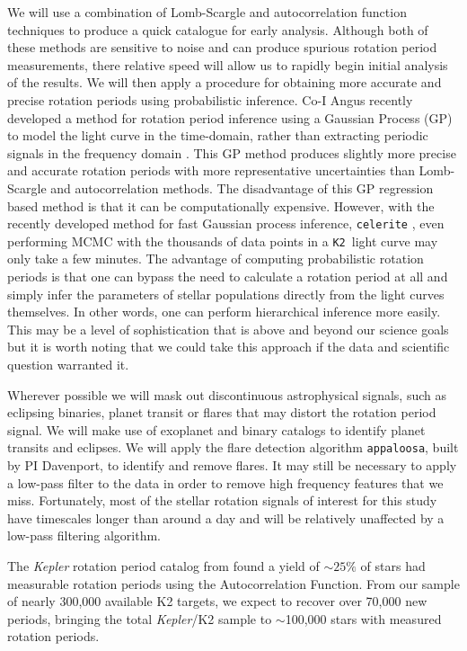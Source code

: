 \documentclass[12pt]{article}
\newcommand{\Kepler}{\textsl{Kepler}\xspace}
\newcommand{\ktwo}{{\tt K2}}
\begin{document}
We will use a combination of Lomb-Scargle and autocorrelation function
techniques to produce a quick catalogue for early analysis.
Although both of these methods are sensitive to noise and can produce spurious
rotation period measurements, there relative speed will allow us to rapidly
begin initial analysis of the results.
We will then apply a procedure for obtaining more accurate and precise
rotation periods using probabilistic inference.
Co-I Angus recently developed a method for rotation period inference using a
Gaussian Process (GP) to model the light curve in the time-domain, rather than
extracting periodic signals in the frequency domain \citet{angus2016c}. 
This GP method produces slightly more precise and accurate rotation periods
with more representative uncertainties than Lomb-Scargle and autocorrelation
methods.
The disadvantage of this GP regression based method is that it can be
computationally expensive.
However, with the recently developed method for fast Gaussian process
inference, {\tt celerite} \citep{foreman-mackey2017}, even performing MCMC
with the thousands of data points in a \ktwo\ light curve may only take a few
minutes.
The advantage of computing probabilistic rotation periods is that one can
bypass the need to calculate a rotation period at all and simply infer the
parameters of stellar populations directly from the light curves themselves.
In other words, one can perform hierarchical inference more easily.
This may be a level of sophistication that is above and beyond our science
goals but it is worth noting that we could take this approach if the data and
scientific question warranted it.

Wherever possible we will mask out discontinuous astrophysical signals, such as
eclipsing binaries, planet transit or flares that may distort the rotation
period signal.
We will make use of exoplanet and binary catalogs to identify planet transits
and eclipses.
We will apply the flare detection algorithm {\tt appaloosa}, built by PI Davenport, 
to identify and remove flares.
It may still be necessary to apply a low-pass filter to the data in order to
remove high frequency features that we miss.
Fortunately, most of the stellar rotation signals of interest for this study
have timescales longer than around a day and will be relatively unaffected by
a low-pass filtering algorithm.

The \Kepler rotation period catalog from \citet{mcquillan2014} found a yield
of $\sim25\%$ of stars had measurable rotation periods using the
Autocorrelation Function. From our sample of nearly 300,000 available K2 targets, we
expect to recover over 70,000 new periods, bringing the total
\Kepler/K2 sample to $\sim$100,000 stars with measured rotation periods.
\end{document}
